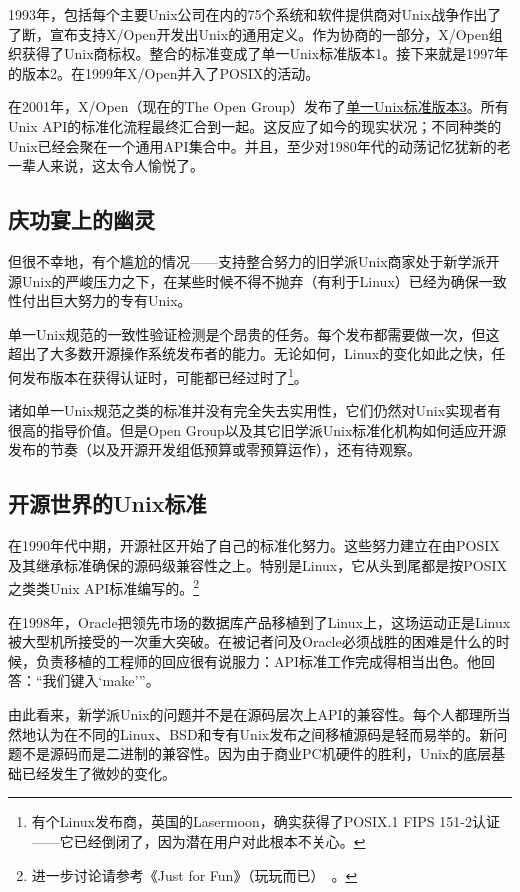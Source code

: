 \documentclass[12pt,oneside]{ctexbook}
\begin{document}
\begin{common-format}
1993年，包括每个主要Unix公司在内的75个系统和软件提供商对Unix战争作出了了断，宣布支持X/Open开发出Unix的通用定义。作为协商的一部分，X/Open组织获得了Unix商标权。整合的标准变成了单一Unix标准版本1。接下来就是1997年的版本2。在1999年X/Open并入了POSIX的活动。

在2001年，X/Open（现在的The Open Group）发布了\href{http://www.unix.org/version3/}{单一Unix标准版本3}。所有Unix API的标准化流程最终汇合到一起。这反应了如今的现实状况；不同种类的Unix已经会聚在一个通用API集合中。并且，至少对1980年代的动荡记忆犹新的老一辈人来说，这太令人愉悦了。

\subsection{庆功宴上的幽灵}
但很不幸地，有个尴尬的情况——支持整合努力的旧学派Unix商家处于新学派开源Unix的严峻压力之下，在某些时候不得不抛弃（有利于Linux）已经为确保一致性付出巨大努力的专有Unix。

单一Unix规范的一致性验证检测是个昂贵的任务。每个发布都需要做一次，但这超出了大多数开源操作系统发布者的能力。无论如何，Linux的变化如此之快，任何发布版本在获得认证时，可能都已经过时了\footnote{有个Linux发布商，英国的Lasermoon，确实获得了POSIX.1 FIPS 151-2认证——它已经倒闭了，因为潜在用户对此根本不关心。}。

诸如单一Unix规范之类的标准并没有完全失去实用性，它们仍然对Unix实现者有很高的指导价值。但是Open Group以及其它旧学派Unix标准化机构如何适应开源发布的节奏（以及开源开发组低预算或零预算运作），还有待观察。


\subsection{开源世界的Unix标准}
在1990年代中期，开源社区开始了自己的标准化努力。这些努力建立在由POSIX及其继承标准确保的源码级兼容性之上。特别是Linux，它从头到尾都是按POSIX之类类Unix API标准编写的。\footnote{进一步讨论请参考《Just for Fun》（玩玩而已）~\cite{Torvalds}。}

在1998年，Oracle把领先市场的数据库产品移植到了Linux上，这场运动正是Linux被大型机所接受的一次重大突破。在被记者问及Oracle必须战胜的困难是什么的时候，负责移植的工程师的回应很有说服力：API标准工作完成得相当出色。他回答：“我们键入‘make’”。

由此看来，新学派Unix的问题并不是在源码层次上API的兼容性。每个人都理所当然地认为在不同的Linux、BSD和专有Unix发布之间移植源码是轻而易举的。新问题不是源码而是二进制的兼容性。因为由于商业PC机硬件的胜利，Unix的底层基础已经发生了微妙的变化。


\end{common-format}
\end{document}
